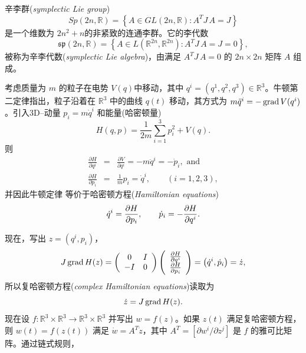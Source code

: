 \documentclass[11pt,fontset=founder]{ctexart}
\begin{document}
辛李群(\emph{symplectic Lie group})
\begin{equation*}
Sp(2n,\mathbb{R})=\left\{ A\in GL(2n,\mathbb{R}):A^{T}J\mathbf{\,}A=J\right\}
\end{equation*}
是一个维数为 $2n^{2}+n$的非紧致的连通李群。它的李代数
\begin{equation*}
\mathfrak{sp}(2n,\mathbb{R})=\left\{ A\in L(\mathbb{R}^{2n},\mathbb{R}%
^{2n}):A^{T}J\mathbf{\,}A=J=0\right\} ,
\end{equation*}
被称为辛李代数(\emph{symplectic Lie algebra})，由满足 $A^{T}J\mathbf{\,}A=0$ 的 $2n\times 2n$ 矩阵 $A$ 组成。

考虑质量为 $m$ 的粒子在电势 $V(q)$中移动，其中 $q^{i}=(q^{1},q^{2},q^{3})\in \mathbb{R}^{3}$。牛顿第二定律指出，粒子沿着在 $\mathbb{R}^{3}$ 中的曲线 $q(t)$ 移动，其方式为 $m\ddot{q}^{i}=-\mathop{\rm grad}V(q^{i})$。引入3D–动量 $p_{i}=m\dot{q}^{i}$ 和能量(哈密顿量)
\begin{equation*}
H(q,p)=\frac{1}{2m}\sum_{i=1}^{3}p_{i}^{2}+V(q).
\end{equation*}
则
\begin{eqnarray*}
\frac{\partial H}{\partial q^{i}} &=&\frac{\partial V}{\partial q^{i}}=-m%
\ddot{q}^{i}=-\dot{p}_{i},\text{ \ \ and} \\
\frac{\partial H}{\partial p_{i}} &=&\frac{1}{m}p_{i}=\dot{q}^{i},\qquad
(i=1,2,3),
\end{eqnarray*}
并因此牛顿定律  等价于哈密顿方程(\textit{Hamiltonian equations})
\begin{equation*}
\dot{q}^{i}=\frac{\partial H}{\partial p_{i}},\qquad \dot{p}_{i}=-\frac{%
\partial H}{\partial q^{i}}.
\end{equation*}

现在，写出 $z=(q^{i},p_{i})$，
\begin{equation*}
J\limfunc{grad}H(z)=\left(
\begin{array}{cc}
0 & I \\
-I & 0%
\end{array}
\right) \left(
\begin{array}{c}
\frac{\partial H}{\partial q^{i}} \\
\frac{\partial H}{\partial p_{i}}%
\end{array}
\right) =\left( \dot{q}^{i},\dot{p}_{i}\right) =\dot{z},
\end{equation*}
所以复哈密顿方程(\textit{complex Hamiltonian equations})读取为
\begin{equation*}
\dot{z}=J\mathop{\rm grad}H(z).
\end{equation*}
现在设 $f:\mathbb{R}^{3}\times \mathbb{R}^{3}\rightarrow \mathbb{R}%
^{3}\times \mathbb{R}^{3}$ 并写出 $w=f(z)$。如果 $z(t)$ 满足复哈密顿方程，则 $w(t)=f(z(t))$ 满足 $\dot{w}=A^{T}\dot{z}$，其中 $A^{T}=[\partial w^{i}/\partial z^{j}]$ 是 $f$ 的雅可比矩阵。通过链式规则，
\end{document}
